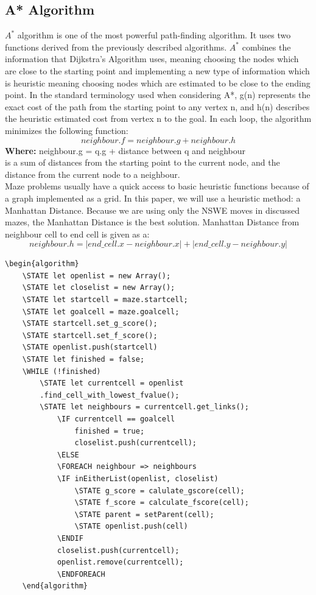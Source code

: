 \subsection{A* Algorithm}
$A^*$ algorithm is one of the most powerful path-finding algorithm. It uses two functions derived from the previously described algorithms. $A^*$ combines the information that Dijkstra’s Algorithm uses, meaning choosing the nodes which are close to the starting point and implementing a new type of information which is heuristic meaning choosing nodes which are estimated to be close to the ending point. In the standard terminology used when considering A*, g(n) represents the exact cost of the path from the starting point to any vertex n, and h(n) describes the heuristic estimated cost from vertex n to the goal. In each loop, the algorithm minimizes the following function:
\begin{equation}
neighbour.f = neighbour.g + neighbour.h
\end{equation}
\textbf{Where:}
neighbour.g = q.g + distance between q and neighbour\\
is a sum of distances from the starting point to the current node, and the distance from the current node to a neighbour.	\\
\newline
Maze problems usually have a quick access to basic heuristic functions because of a graph implemented as a grid. In this paper, we will use a heuristic method: a Manhattan Distance. Because we are using only the NSWE moves in discussed mazes, the Manhattan Distance is the best solution.
Manhattan Distance from neighbour cell to end cell is given as a:
\begin{equation}
neighbour.h = |end\_cell.x - neighbour.x| + |end\_cell.y - neighbour.y|
\end{equation}
\begin{lstlisting}[caption={Pseudocode for a A* algorithm}]
	\begin{algorithm}
	\STATE let openlist = new Array();
	\STATE let closelist = new Array();
	\STATE let startcell = maze.startcell;
	\STATE let goalcell = maze.goalcell;
	\STATE startcell.set_g_score();
	\STATE startcell.set_f_score();
	\STATE openlist.push(startcell)
	\STATE let finished = false;
	\WHILE (!finished)
		\STATE let currentcell = openlist    
		.find_cell_with_lowest_fvalue();
		\STATE let neighbours = currentcell.get_links();
			\IF currentcell == goalcell
				finished = true;
				closelist.push(currentcell);
			\ELSE 
			\FOREACH neighbour => neighbours	
			\IF inEitherList(openlist, closelist)
				\STATE g_score = calulate_gscore(cell);
				\STATE f_score = calculate_fscore(cell);
				\STATE parent = setParent(cell);
				\STATE openlist.push(cell)
			\ENDIF
			closelist.push(currentcell);
			openlist.remove(currentcell);
	    	\ENDFOREACH
	\end{algorithm}
	\end{lstlisting}

